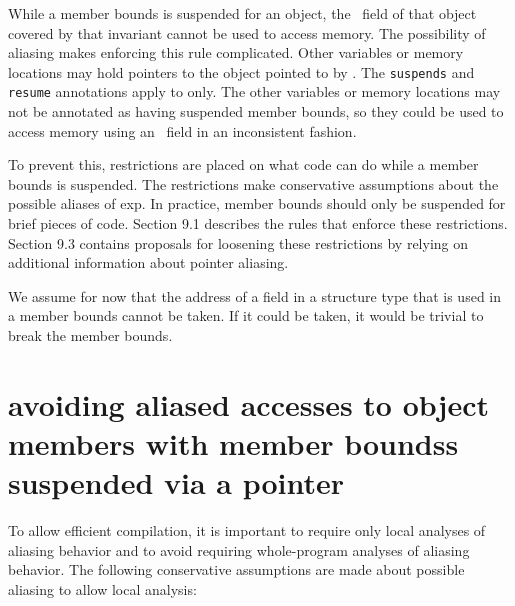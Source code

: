 While a member bounds is suspended for an object, the
\arrayptr\ field of that object covered by that invariant
cannot be used to access memory. The possibility of aliasing makes
enforcing this rule complicated. Other variables or memory locations may
hold pointers to the object pointed to by . The
\texttt{suspends} and \texttt{resume} annotations apply to 
only. The other variables or memory locations may not be annotated as
having suspended member bounds, so they could be used to access memory
using an \arrayptr\ field in an inconsistent fashion.

To prevent this, restrictions are placed on what code can do while a
member bounds is suspended. The restrictions make conservative
assumptions about the possible aliases of exp. In practice, member
bounds should only be suspended for brief pieces of code. Section 9.1
describes the rules that enforce these restrictions. Section 9.3
contains proposals for loosening these restrictions by relying on
additional information about pointer aliasing.

We assume for now that the address of a field in a structure type that
is used in a member bounds cannot be taken. If it could be taken, it
would be trivial to break the member bounds.

\section{\texorpdfstring{\protect\hypertarget{ux5fRef419201770}{}{\protect\hypertarget{ux5fRef420578671}{}{\protect\hypertarget{ux5fToc420589208}{}{\protect\hypertarget{ux5fToc422906999}{}{\protect\hypertarget{ux5fToc424307728}{}{\protect\hypertarget{ux5fToc426641105}{}{\protect\hypertarget{ux5fToc435434987}{}{\protect\hypertarget{ux5fToc437460820}{}{\protect\hypertarget{ux5fToc440445501}{}{\protect\hypertarget{ux5fToc440449283}{}{\protect\hypertarget{ux5fToc440551933}{}{}}}}}}}}}}}avoiding
aliased accesses to object members with member boundss suspended via a
pointer}{avoiding aliased accesses to object members with member boundss suspended via a pointer}}\label{avoiding-aliased-accesses-to-object-members-with-member-boundss-suspended-via-a-pointer}

To allow efficient compilation, it is important to require only local
analyses of aliasing behavior and to avoid requiring whole-program
analyses of aliasing behavior. The following conservative assumptions
are made about possible aliasing to allow local analysis:

